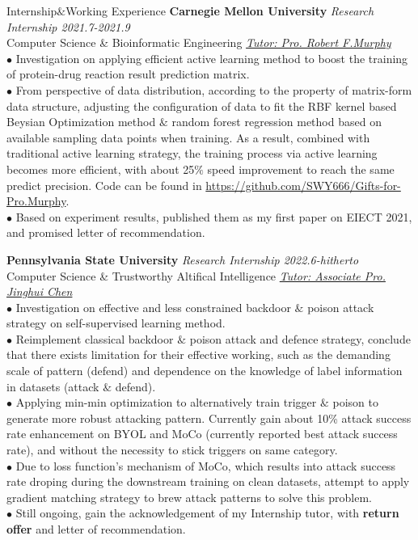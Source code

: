 \documentclass{resume} %
\begin{document}
\begin{rSection}{Internship$\&$Working Experience}
    {\bf Carnegie Mellon University} \hfill {\em Research Internship 2021.7-2021.9} \\
    Computer Science \& Bioinformatic Engineering \hfill {\em \href{{https://www.andrew.cmu.edu/user/murphy/}}{Tutor: Pro. Robert F.Murphy}}\\
    {$\bullet$ Investigation on applying efficient active learning method to boost the training of protein-drug reaction result prediction matrix. \\
    $\bullet$ From perspective of data distribution, according to the property of matrix-form data structure, adjusting the configuration of data to fit the RBF kernel based Beysian Optimization method $\&$ random forest regression method based on available sampling data points when training. As a result, combined with traditional active learning strategy, the training process via active learning becomes more efficient, with about 25$\%$ speed improvement to reach the same predict precision. Code can be found in \url{https://github.com/SWY666/Gifts-for-Pro.Murphy}.\\
    $\bullet$ Based on experiment results, published them as my first paper on EIECT 2021, and promised letter of recommendation.}

    {\bf Pennsylvania State University} \hfill {\em Research Internship 2022.6-hitherto} \\
    Computer Science \& Trustworthy Altifical Intelligence \hfill {\em \href{{https://jinghuichen.github.io/}}{Tutor: Associate Pro. Jinghui Chen}}\\
    {$\bullet$ Investigation on effective and less constrained backdoor $\&$ poison attack strategy on self-supervised learning method. \\
    $\bullet$ Reimplement classical backdoor $\&$ poison attack and defence strategy, conclude that there exists limitation for their effective working, such as the demanding scale of pattern (defend) and dependence on the knowledge of label information in datasets (attack $\&$ defend).\\
    $\bullet$ Applying min-min optimization to alternatively train trigger $\&$ poison to generate more robust attacking pattern. Currently gain about 10\% attack success rate enhancement on BYOL and MoCo (currently reported best attack success rate), and without the necessity to stick triggers on same category.\\
    $\bullet$ Due to loss function's mechanism of MoCo, which results into attack success rate droping during the downstream training on clean datasets, attempt to apply gradient matching strategy to brew attack patterns to solve this problem.\\
    $\bullet$ Still ongoing, gain the acknowledgement of my Internship tutor, with \textbf{return offer} and letter of recommendation.}


\end{rSection}
\end{document}
